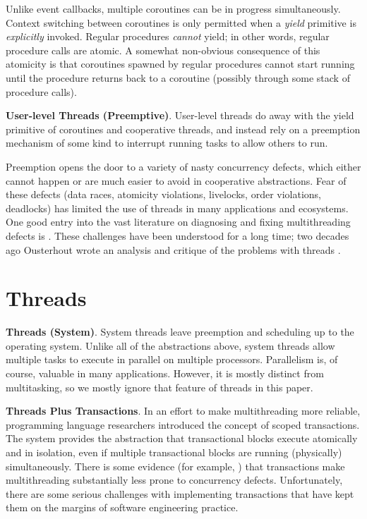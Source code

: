 \documentclass[9pt,preprint]{sigplanconf}
\begin{document}
Unlike event callbacks, multiple coroutines can be in progress simultaneously.
Context switching between coroutines is only permitted when a \emph{yield} primitive is \emph{explicitly} invoked.
Regular procedures \emph{cannot} yield; in other words, regular procedure calls are atomic.
A somewhat non-obvious consequence of this atomicity is that coroutines spawned by regular procedures cannot start running until the procedure returns back to a coroutine (possibly through some stack of procedure calls).


\textbf{User-level Threads (Preemptive)}.
User-level threads do away with the yield primitive of coroutines and cooperative threads, and instead rely on a preemption mechanism of some kind to interrupt running tasks to allow others to run.

Preemption opens the door to a variety of nasty concurrency defects, which either cannot happen or are much easier to avoid in cooperative abstractions.
Fear of these defects (data races, atomicity violations, livelocks, order violations, deadlocks) has limited the use of threads in many applications and ecosystems.
One good entry into the vast literature on diagnosing and fixing multithreading defects is \cite{Lu2008}.
These challenges have been understood for a long time; two decades ago Ousterhout wrote an analysis and critique of the problems with threads \cite{Ousterhout1996}.

\section{Threads}

\textbf{Threads (System)}.
System threads leave preemption and scheduling up to the operating system.
Unlike all of the abstractions above, system threads allow multiple tasks to execute in parallel on multiple processors.
Parallelism is, of course, valuable in many applications.
However, it is mostly distinct from multitasking, so we mostly ignore that feature of threads in this paper.

\textbf{Threads Plus Transactions}.
In an effort to make multithreading more reliable, programming language researchers introduced the concept of scoped transactions.
The system provides the abstraction that transactional blocks execute atomically and in isolation, even if multiple transactional blocks are running (physically) simultaneously.
There is some evidence (for example, \cite{Pankratius2014}) that transactions make multithreading substantially less prone to concurrency defects.
Unfortunately, there are some serious challenges with implementing transactions that have kept them on the margins of software engineering practice.
\end{document}
